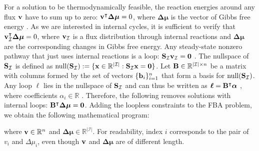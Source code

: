 For a solution to be thermodynamically feasible, the reaction energies around any flux $\bold v$ have to sum up to zero: $\bold v^\intercal \boldsymbol{\Delta \mu} = 0$, where $\boldsymbol{\Delta \mu}$ is the vector of Gibbs free energy \cite{elimination_infeasible_loops}. As we are interested in internal cycles, it is sufficient to verify that $\bold v_\mathcal{I}^\intercal \boldsymbol{\Delta \mu} =0$, where $\bold v_\mathcal{I}$ is a flux distribution through internal reactions and $\boldsymbol{\Delta \mu}$ are the corresponding changes in Gibbs free energy.
Any steady-state nonzero pathway that just uses internal reactions is a loop: $\bold S_{\mathcal{I}} \bold v_{\mathcal{I}} = \bold 0$ \cite{noor_proof_2012}. The nullspace of $\bold S_{\mathcal{I}}$ is defined as $\mathrm{null}(\bold S_{\mathcal{I}}) := \{\bold x \in \mathbb{R}^{|\mathcal{I}|} : \bold S_{\mathcal{I}} \bold x = \bold 0 \}$. Let $\bold B \in \mathbb{R}^{|\mathcal{I}| \times n}$ be a matrix with columns formed by the set of vectors $\{\bold b_i\}_{i=1}^n$ that form a basis for $\mathrm{null}(\bold S_{\mathcal{I}})$. 
Any loop $\boldsymbol \ell$ lies in the nullspace of $\bold S_{\mathcal{I}}$ and can thus be written as $\boldsymbol \ell = \bold B ^\intercal \boldsymbol \alpha$ , where coefficients $\alpha_i \in \mathbb{R}$ \cite{elimination_infeasible_loops}. Therefore, the following removes solutions with internal loops: $\bold B^\intercal \boldsymbol{\Delta \mu} = \bold 0$. Adding the loopless constraints to the \textsf{FBA} problem, we obtain the following mathematical program:
\enlargethispage{1cm}
\quad where $\bold v \in \mathbb{R}^n$ and $\boldsymbol{\Delta \mu} \in \mathbb{R}^{|\mathcal{I}|}$. For readability, index $i$ corresponds to the pair of $v_i$ and $\Delta \mu_i$, even though $\bold v$ and $\boldsymbol{\Delta \mu}$ are of different length.

